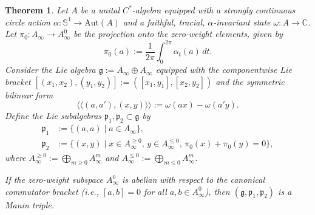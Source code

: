 \documentclass[11pt,reqno]{amsart}
\newtheorem{theorem}{Theorem}[section]
\theoremstyle{definition}
\numberwithin{equation}{section}
\begin{document}
\begin{theorem}
Let $A$ be a unital $C^*$-algebra equipped with a strongly continuous circle action $\alpha: \mathbb{S}^1 \rightarrow \text{Aut}(A)$ and a faithful, tracial, $\alpha$-invariant state $\omega: A \rightarrow \mathbb{C}$. Let $\pi_0: A_{\infty} \rightarrow A_{\infty}^0$ be the projection onto the zero-weight elements, given by
\[
\pi_0(a) := \frac{1}{2\pi} \int_0^{2\pi} \alpha_t(a) \, dt.
\]
Consider the Lie algebra $\mathfrak{g} := A_{\infty} \oplus A_{\infty}$ equipped with the componentwise Lie bracket $[(x_1, x_2), (y_1, y_2)] := ([x_1, y_1], [x_2, y_2])$ and the symmetric bilinear form
\[
\langle\langle (a, a'), (x, y) \rangle\rangle := \omega(ax) - \omega(a'y).
\]
Define the Lie subalgebras $\mathfrak{p}_1, \mathfrak{p}_2 \subset \mathfrak{g}$ by
\begin{align*}
\mathfrak{p}_1 &:= \{(a, a) \mid a \in A_{\infty}\}, \\
\mathfrak{p}_2 &:= \{(x, y) \mid x \in A_{\infty}^{\ge 0}, \, y \in A_{\infty}^{\le 0}, \, \pi_0(x) + \pi_0(y) = 0\},
\end{align*}
where $A_{\infty}^{\ge 0} := \bigoplus_{m \ge 0} A_{\infty}^m$ and $A_{\infty}^{\le 0} := \bigoplus_{m \le 0} A_{\infty}^m$. 

If the zero-weight subspace $A_{\infty}^0$ is abelian with respect to the canonical commutator bracket (i.e., $[a, b] = 0$ for all $a, b \in A_{\infty}^0$), then $(\mathfrak{g}, \mathfrak{p}_1, \mathfrak{p}_2)$ is a Manin triple.
\end{theorem}
\end{document}
